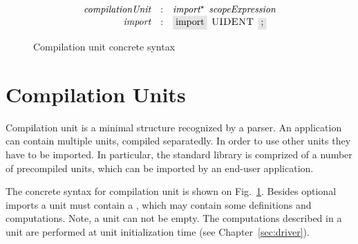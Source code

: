 \begin{figure}[t]
  \[
    \begin{array}{rcl}
      \defterm{compilationUnit}  & : & \nonterm{import}^\star\s\nonterm{scopeExpression}\\
      \defterm{import}           & : & \term{import}\s\token{UIDENT}\s\term{;}
    \end{array}
  \]
  \caption{Compilation unit concrete syntax}
  \label{compilation_unit}
\end{figure}

\section{Compilation Units}
\label{sec:compilation_units}

Compilation unit is a minimal structure recognized by a parser. An application can contain multiple units, compiled separatedly.
In order to use other units they have to be imported. In particular, the standard library is comprized of a number of precompiled units,
which can be imported by an end-user application.

The concrete syntax for compilation unit is shown on Fig.~\ref{compilation_unit}. Besides optional imports a unit must contain
a , which may contain some definitions and computations. Note, a unit can not be empty. The computations described in
a unit are performed at unit initialization time (see Chapter~\ref{sec:driver}).


